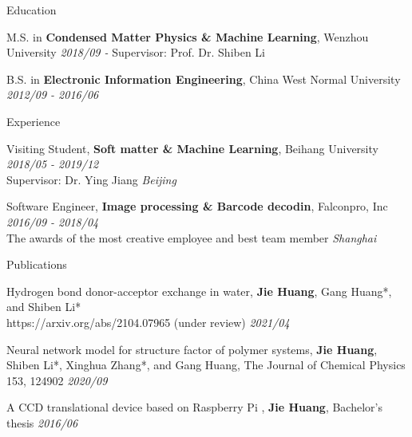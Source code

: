 \documentclass{resume} %
\begin{document}
\begin{rSection}{Education}
\begin{rSubsection}{}{}{}{}
\item M.S. in \textbf{Condensed Matter Physics \& Machine Learning}, Wenzhou University \hfill \textit{2018/09 -} Supervisor: Prof. Dr. Shiben Li
\item B.S. in \textbf{Electronic Information Engineering}, China West Normal University \hfill \textit{2012/09 - 2016/06}
\end{rSubsection}
\end{rSection}


\begin{rSection}{Experience}
\begin{rSubsection}{}{}{}{}
\item Visiting Student, \textbf{Soft matter \& Machine Learning}, Beihang University \hfill\textit{2018/05 - 2019/12} \\ Supervisor: Dr. Ying Jiang \hfill \textit{Beijing}
\item Software Engineer, \textbf{Image processing \& Barcode decodin}, Falconpro, Inc \hfill \textit{2016/09 - 2018/04}  \\ The awards of the most creative employee and best team member  \hfill \textit{Shanghai}
\end{rSubsection}
\end{rSection}



\begin{rSection}{Publications}
\begin{rSubsection}{}{}{}{}
\item Hydrogen bond donor-acceptor exchange in water, \textbf{Jie Huang}, Gang Huang*, and Shiben Li*\\ https://arxiv.org/abs/2104.07965 (under review) \hfill \textit{2021/04}
\item Neural network model for structure factor of polymer systems, \textbf{Jie Huang}, Shiben Li*, Xinghua Zhang*, and Gang Huang, The Journal of Chemical Physics 153, 124902  \hfill \textit{2020/09}
\item A CCD translational device based on Raspberry Pi , \textbf{Jie Huang}, Bachelor's thesis \hfill \textit{2016/06}
\end{rSubsection}
\end{rSection}
\end{document}

